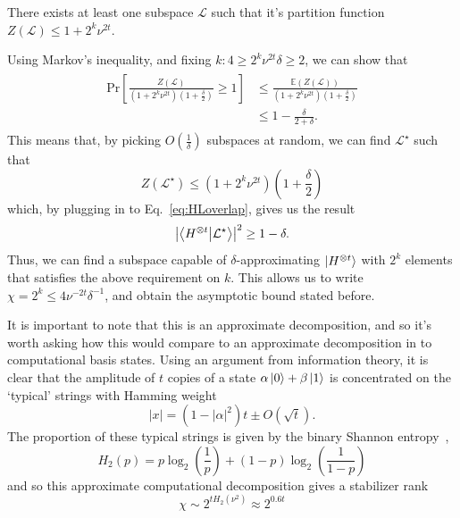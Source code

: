 \documentclass{standalone}
\begin{document}
\begin{cor}
There exists at least one subspace $\mathcal{L}$ such that it's partition function $Z(\mathcal{L})\leq1+2^{k}\nu^{2t}$.
\end{cor}
Using Markov's inequality, and fixing $k: 4\geq 2^{k}\nu^{2t}\delta\geq 2$, we can show that~\cite{Bravyi2016b}
\begin{align}\label{eq:markovineq}
\begin{split}
\text{Pr}[\frac{Z(\mathcal{L})}{(1+2^{k}\nu^{2t})(1+\frac{\delta}{2})}\geq 1] 
&\leq \frac{\mathbb{E}(Z(\mathcal{L}))}{(1+2^{k}\nu^{2t})(1+\frac{\delta}{2})} \\
&\leq 1-\frac{\delta}{2+\delta}.
\end{split}
\end{align}
This means that, by picking $O(\frac{1}{\delta})$ subspaces at random, we can find $\mathcal{L}^{\star}$ such that
\begin{equation}
    Z(\mathcal{L^{\star}}) \leq (1+2^{k}\nu^{2t})(1+\frac{\delta}{2})
\end{equation}
which, by plugging in to Eq.~\ref{eq:HLoverlap}, gives us the result
\begin{equation}
    \left|\braket{H^{\otimes t}}{\mathcal{L}^{\star}}\right|^{2}\geq 1-\delta.
\end{equation}
Thus, we can find a subspace capable of $\delta$-approximating $\ket{H^{\otimes t}}$ with $2^{k}$ elements that satisfies the above requirement on $k$. This allows us to write $\chi = 2^{k} \leq 4\nu^{-2t}\delta^{-1}$, and obtain the asymptotic bound stated before.
\par
It is important to note that this is an approximate decomposition, and so it's worth asking how this would compare to an approximate decomposition in to computational basis states. Using an argument from information theory, it is clear that the amplitude of $t$ copies of a state $\alpha\ket{0}+\beta\ket{1}$ is concentrated on the `typical' strings with Hamming weight~\cite{Bravyi2016b,Preskill2016}
\begin{equation}\label{eq:hweight}
    \vert x \vert = (1-\left|\alpha\right|^{2})t\pm O(\sqrt{t}).
\end{equation}
The proportion of these typical strings is given by the binary Shannon entropy~\cite{Preskill2016}, 
\[H_{2}(p)= p\log_{2}\left(\frac{1}{p}\right) + (1-p)\log_{2}\left(\frac{1}{1-p}\right)\] 
and so this approximate computational decomposition gives a stabilizer rank~\cite{Bravyi2015}
\begin{equation}\label{eq:approxcomp}
    \chi\sim 2^{tH_{2}(\nu^{2})} \approx 2^{0.6t}
\end{equation}
\end{document}
